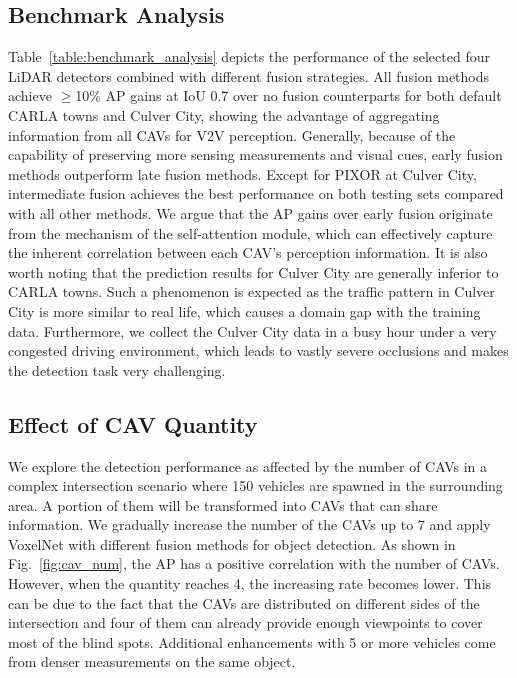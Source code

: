 \subsection{Benchmark Analysis}
Table~\ref{table:benchmark_analysis} depicts the performance of the selected four LiDAR detectors combined with different fusion strategies. All fusion methods achieve $\geq$10\% AP gains at IoU 0.7 over no fusion counterparts for both default CARLA towns and Culver City, showing the advantage of aggregating information from all CAVs for V2V perception. Generally, because of the capability of preserving more sensing measurements and visual cues, early fusion methods outperform late fusion methods. Except for PIXOR at Culver City, intermediate fusion achieves the best performance on both testing sets compared with all other methods. We argue that the AP gains over early fusion originate from the mechanism of the self-attention module, which can effectively capture the inherent correlation between each CAV's perception information. It is also worth noting that the prediction results for Culver City are generally inferior to CARLA towns. Such a phenomenon is expected as the traffic pattern in Culver City is more similar to real life, which causes a domain gap with the training data. Furthermore, we collect the Culver City data in a busy hour under a very congested driving environment, which leads to vastly severe occlusions and makes the detection task very challenging.

\subsection{Effect of CAV Quantity}
We explore the detection performance as affected by the number of CAVs in a complex intersection scenario where 150 vehicles are spawned in the surrounding area. A portion of them will be transformed into CAVs that can share information. We gradually increase the number of the CAVs up to 7 and apply VoxelNet with different fusion methods for object detection. As shown in Fig.~\ref{fig:cav_num}, the AP has a positive correlation with the number of CAVs. However, when the quantity reaches 4, the increasing rate becomes lower. This can be due to the fact that the CAVs are distributed on different sides of the intersection and four of them can already provide enough viewpoints to cover most of the blind spots. Additional enhancements with 5 or more vehicles come from denser measurements on the same object.


